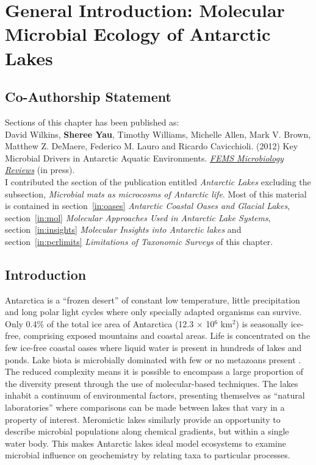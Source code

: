 \chapter[General Introduction]{General Introduction: Molecular Microbial Ecology of Antarctic Lakes}
\label{ch:intro}


\section*{Co-Authorship Statement}

Sections of this chapter has been published as:\\

David Wilkins, \textbf{Sheree Yau}, Timothy Williams, Michelle Allen, Mark V. Brown, Matthew Z. DeMaere,
Federico M. Lauro and Ricardo Cavicchioli. (2012)
Key Microbial Drivers in Antarctic Aquatic Environments.
\textit{\underline{FEMS Microbiology Reviews}} 
(in press).\\

I contributed the section of the publication entitled \emph{Antarctic Lakes} excluding the subsection, \emph{Microbial mats as microcosms of Antarctic life}.
Most of this material is contained in section~\ref{in:oases} \emph{Antarctic Coastal Oases and Glacial Lakes}, section~\ref{in:mol} \emph{Molecular Approaches Used in Antarctic Lake Systems}, section~\ref{in:insights} \emph{Molecular Insights into Antarctic lakes} and section~\ref{in:pcrlimits} \emph{Limitations of Taxonomic Surveys} of this chapter.
\newpage


\section{Introduction}
Antarctica is a ``frozen desert'' of constant low temperature, little precipitation and long polar light cycles where only specially adapted organisms can survive.
Only 0.4\% of the total ice area of Antarctica (12.3 $\times$ 10$^6$ km$^2$) is seasonally ice-free, comprising exposed mountains and coastal areas. %
Life is concentrated on the few ice-free coastal oases where liquid water is present in hundreds of lakes and ponds.
Lake biota is microbially dominated with few or no metazoans present \cite{Laybourne-Parry1997}.
The reduced complexity means it is possible to encompass a large proportion of the diversity present through the use of molecular-based techniques.
The lakes inhabit a continuum of environmental factors, presenting themselves as ``natural laboratories'' where comparisons can be made between lakes that vary in a property of interest. 
Meromictic lakes similarly provide an opportunity to describe microbial populations along chemical gradients, but within a single water body. 
This makes Antarctic lakes ideal model ecosystems to examine microbial influence on geochemistry by relating taxa to particular processes\cite{Laybourne-Parry2007}.

